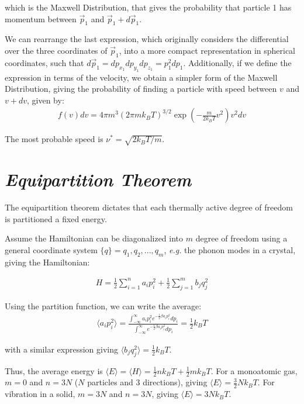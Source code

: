 \documentclass[book.tex]{subfiles}
\begin{document}
\noindent which is the Maxwell Distribution, that gives the probability that particle 1 has momentum between $\vec{p}_1$ and $\vec{p}_1 + d\vec{p}_1$.

We can rearrange the last expression, which originally considers the differential over the three coordinates of $\vec{p}_1$, into a more compact representation in spherical coordinates, such that $d\vec{p}_1 = dp_{x_1}dp_{y_1}dp_{z_1} = p_1^2dp_1$. Additionally, if we define the expression in terms of the velocity, we obtain a simpler form of the Maxwell Distribution, giving the probability of finding a particle with speed between $v$ and $v + dv$, given by:
\begin{align}\label{Eq3}
f(v)dv = 4\pi m^3 (2\pi mk_BT)^{3/2}\exp\left(-\frac{m}{2k_BT}v^2\right)v^2dv
\end{align}

The most probable speed is $\nu^*= \sqrt{2k_BT/m}$. 

\section{\textit{Equipartition Theorem}}
The equipartition theorem dictates that each thermally active degree of freedom is partitioned a fixed energy.

Assume the Hamiltonian can be diagonalized into $m$ degree of freedom using a general coordinate system $\{q\} = q_1,q_2,...,q_m$, \textit{e.g.} the phonon modes in a crystal, giving the Hamiltonian:

\begin{align}\label{Eq4}
H = \frac{1}{2}\sum_{i=1}^na_ip_i^2 + \frac{1}{2}\sum_{j=1}^mb_jq_j^2
\end{align}

Using the partition function, we can write the average:
\begin{align}
\langle a_i p_i^2\rangle = \frac{\int_{-\infty}^\infty a_ip_i^2e^{-\frac{1}{2}\beta a_ip_i^2}dp_i}{\int_{-\infty}^\infty e^{-\frac{1}{2}\beta a_ip_i^2}dp_i} = \frac{1}{2}k_BT 
\end{align}

\noindent with a similar expression giving $\langle b_jq_j^2\rangle = \frac{1}{2}k_BT$.

Thus, the average energy is $\langle E \rangle = \langle H \rangle = \frac{1}{2}nk_BT + \frac{1}{2}mk_BT$. For a monoatomic gas, $m=0$ and $n=3N$ ($N$ particles and 3 directions), giving $\langle E\rangle = \frac{3}{2}Nk_BT$. For vibration in a solid, $m=3N$ and $n=3N$, giving $\langle E \rangle = 3Nk_BT$.
\end{document}
